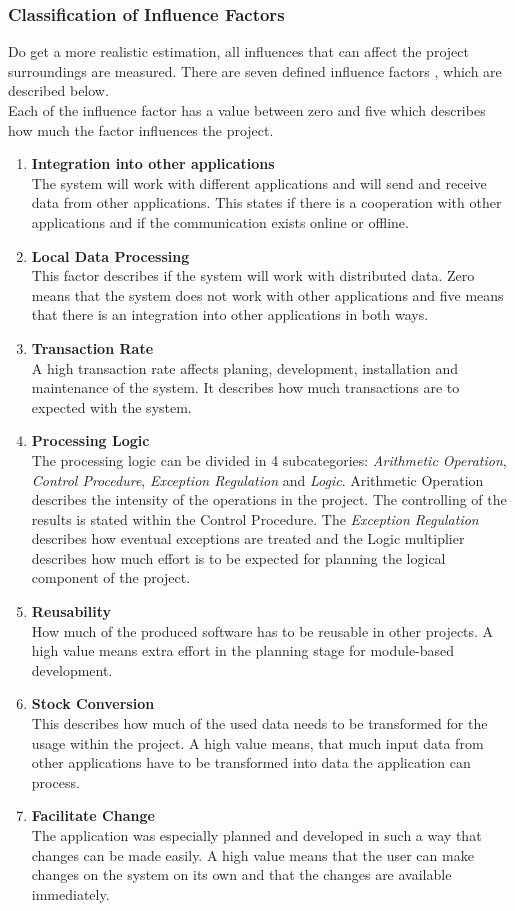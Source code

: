 \subsubsection{ Classification of Influence Factors}\label{fp:classificationInfluence}

Do get a more realistic estimation, all influences that can affect the project surroundings are measured. There are seven defined influence factors \cite{Softwaremanagement}, which are described below.\\
Each of the influence factor has a value between zero and five which describes how much the factor influences the project.\\

\begin{enumerate}
	\item \textbf{Integration into other applications}\\The system will work with different applications and will send and receive data from other applications. This states if there is a cooperation with other applications and if the communication exists online or offline.
	\item \textbf{Local Data Processing}\\This factor describes if the system will work with distributed data. Zero means that the system does not work with other applications and five means that there is an integration into other applications in both ways.
	\item \textbf{Transaction Rate}\\A high transaction rate affects planing, development, installation and maintenance of the system. It describes how much transactions are to expected with the system.
	\item \textbf{Processing Logic}\\The processing logic can be divided in 4 subcategories: \textit{Arithmetic Operation}, \textit{Control Procedure}, \textit{Exception Regulation} and \textit{Logic}. Arithmetic Operation describes the intensity of the operations in the project. The controlling of the results is stated within the Control Procedure. The \textit{Exception Regulation} describes how eventual exceptions are treated and the Logic multiplier describes how much effort is to be expected for planning the logical component of the project.
	\item \textbf{Reusability}\\ How much of the produced software has to be reusable in other projects. A high value means extra effort in the planning stage for module-based development.
	\item \textbf{Stock Conversion}\\ This describes how much of the used data needs to be transformed for the usage within the project. A high value means, that much input data from other applications have to be transformed into data the application can process.
	\item \textbf{Facilitate Change}\\ The application was especially planned and developed in such a way that changes can be made easily. A high value means that the user can make changes on the system on its own and that the changes are available immediately.
\end{enumerate}
